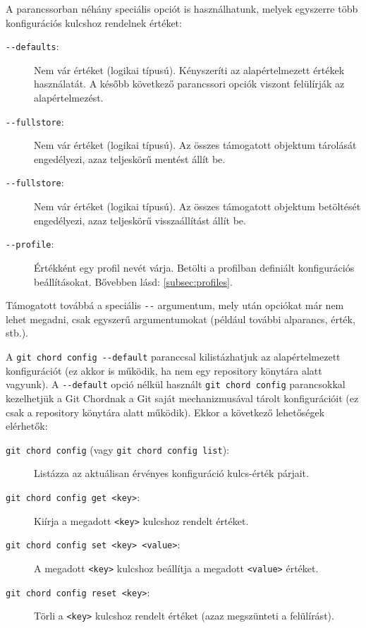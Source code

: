 \documentclass[final]{elteikthesis}[2025/03/25]
\begin{document}
A parancssorban néhány speciális opciót is használhatunk, melyek egyszerre több konfigurációs kulcshoz rendelnek értéket:

\begin{description}
    \item[\texttt{{-}{-}defaults}:]
        Nem vár értéket (logikai típusú).
        Kényszeríti az alapértelmezett értékek használatát.
        A később következő parancssori opciók viszont felülírják az alapértelmezést.
    \item[\texttt{{-}{-}fullstore}:]
        Nem vár értéket (logikai típusú).
        Az összes támogatott objektum tárolását engedélyezi, azaz teljeskörű mentést állít be.
    \item[\texttt{{-}{-}fullstore}:]
        Nem vár értéket (logikai típusú).
        Az összes támogatott objektum betöltését engedélyezi, azaz teljeskörű visszaállítást állít be.
    \item[\texttt{{-}{-}profile}:]
        Értékként egy profil nevét várja.
        Betölti a profilban definiált konfigurációs beállításokat.
        Bővebben lásd: \ref{subsec:profiles}.
\end{description}

Támogatott továbbá a speciális \verb|--| argumentum, mely után opciókat már nem lehet megadni, csak egyszerű argumentumokat (például további alparancs, érték, stb.).

A \verb|git chord config --default| paranccsal kilistázhatjuk az alapértelmezett konfigurációt
(ez akkor is működik, ha nem egy repository könytára alatt vagyunk).
A \verb|--default| opció nélkül használt \verb|git chord config| parancsokkal kezelhetjük a Git Chordnak a Git saját mechanizmusával tárolt konfigurációit
(ez csak a repository könytára alatt működik).
Ekkor a következő lehetőségek elérhetők:

\begin{description}
    \item[\texttt{git chord config} (vagy \texttt{git chord config list}):]
        Listázza az aktuálisan érvényes konfiguráció kulcs-érték párjait.
    \item[\texttt{git chord config get <key>}:]
        Kiírja a megadott \verb|<key>| kulcshoz rendelt értéket.
    \item[\texttt{git chord config set <key> <value>}:]
        A megadott \verb|<key>| kulcshoz beállítja a megadott \verb|<value>| értéket.
    \item[\texttt{git chord config reset <key>}:]
        Törli a \verb|<key>| kulcshoz rendelt értéket (azaz megszünteti a felülírást).
\end{description}
\end{document}
